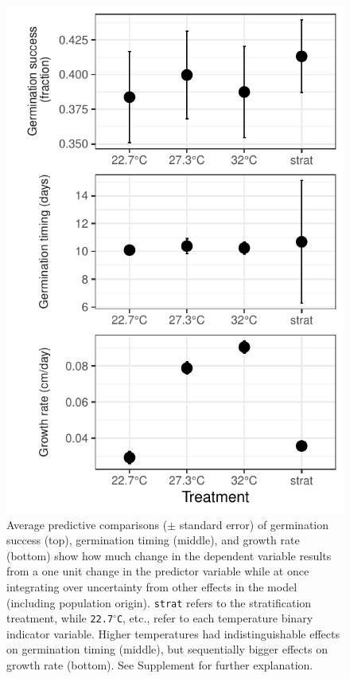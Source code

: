 \documentclass[11pt]{article}\usepackage[]{graphicx}\usepackage[]{color}
\begin{document}
\begin{figure}[H]
	\begin{center}
		\includegraphics[width=.5\textwidth]{apc_fig.pdf}
		\caption{Average predictive comparisons ($\pm$ standard error) of germination success (top), germination timing (middle), and growth rate (bottom) show how much change in the dependent variable results from a one unit change in the predictor variable while at once integrating over uncertainty from other effects in the model (including population origin). \texttt{strat} refers to the stratification treatment, while \texttt{22.7$^{\circ}$C}, etc., refer to each temperature binary indicator variable. Higher temperatures had indistinguishable effects on germination timing (middle), but sequentially bigger effects on growth rate (bottom). See Supplement for further explanation.}
		\label{fig:apc}
	\end{center}
\end{figure}
\end{document}
